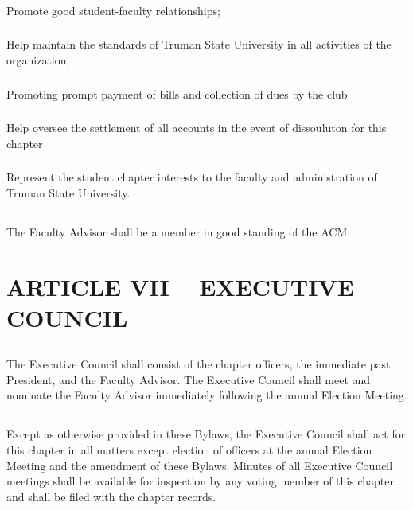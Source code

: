 \documentclass[12pt]{article}
\begin{document}
\subsubsection{}	Promote good student-faculty relationships;
\subsubsection{}	Help maintain the standards of Truman State University in all activities of the organization;
\subsubsection{}	Promoting prompt payment of bills and collection of dues by the club
\subsubsection{}	Help oversee the settlement of all accounts in the event of dissouluton for this chapter
\subsubsection{}	Represent the student chapter interests to the faculty and administration of Truman State University.
\subsection{}	The Faculty Advisor shall be a member in good standing of the ACM.

\section{ARTICLE VII – EXECUTIVE COUNCIL}
\subsection{}	The Executive Council shall consist of the chapter officers, the immediate past President, and the Faculty Advisor. The Executive Council shall meet and nominate the Faculty Advisor immediately following the annual Election Meeting.
\subsection{}	Except as otherwise provided in these Bylaws, the Executive Council shall act for this chapter in all matters except election of officers at the annual Election Meeting and the amendment of these Bylaws. Minutes of all Executive Council meetings shall be available for inspection by any voting member of this chapter and shall be filed with the chapter records.
\end{document}
